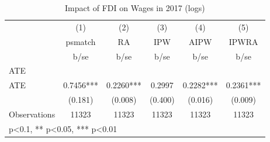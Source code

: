 \begin{table}[htbp]\centering
\def\sym#1{\ifmmode^{#1}\else\(^{#1}\)\fi}
\caption{Impact of FDI on Wages in 2017 (logs) \label{ates\_wag}}
\begin{tabular}{l*{5}{c}}
\hline\hline
                &\multicolumn{1}{c}{(1)}&\multicolumn{1}{c}{(2)}&\multicolumn{1}{c}{(3)}&\multicolumn{1}{c}{(4)}&\multicolumn{1}{c}{(5)}\\
                &\multicolumn{1}{c}{psmatch}&\multicolumn{1}{c}{RA}&\multicolumn{1}{c}{IPW}&\multicolumn{1}{c}{AIPW}&\multicolumn{1}{c}{IPWRA}\\
                &     b/se   &     b/se   &     b/se   &     b/se   &     b/se   \\
\hline
ATE             &            &            &            &            &            \\
ATE             &   0.7456***&   0.2260***&   0.2997   &   0.2282***&   0.2361***\\
                &  (0.181)   &  (0.008)   &  (0.400)   &  (0.016)   &  (0.009)   \\
\hline
Observations    &    11323   &    11323   &    11323   &    11323   &    11323   \\
\hline\hline
\multicolumn{6}{l}{\footnotesize * p<0.1, ** p<0.05, *** p<0.01}\\
\end{tabular}
\end{table}
